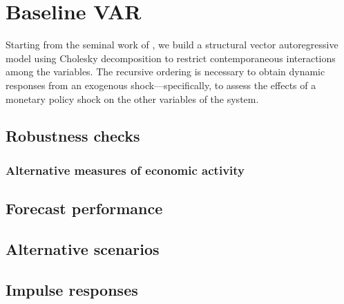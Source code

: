 \section{Baseline VAR}
    Starting from the seminal work of \citet{Sims1992}, we build a structural vector autoregressive model using Cholesky decomposition to restrict contemporaneous interactions among the variables. The recursive ordering is necessary to obtain dynamic responses from an exogenous shock---specifically, to assess the effects of a monetary policy shock on the other variables of the system.
    
    
    \subsection{Robustness checks}
        \subsubsection{Alternative measures of economic activity}
    \subsection{Forecast performance}
        \lipsum[1]
    \subsection{Alternative scenarios}
        \lipsum[1]
    \subsection{Impulse responses}
        \lipsum[1]
